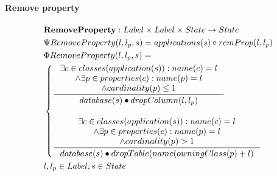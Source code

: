 \documentclass[11pt]{article}
\begin{document}
\paragraph{Remove property}
\begin{align*}
&	\mathbf{RemoveProperty} : Label \times Label \times State \rightarrow State \\
&	\Psi RemoveProperty(l, l_p, s) =  applications(s) \circ  remProp(l, l_p) \\
&	\Phi RemoveProperty(l, l_p, s) = \\
& \begin{cases}
		 \inference{\exists c \in classes(application(s)) : name(c) = l\\ 
		\wedge \exists p \in properties(c) : name(p) = l \\ \wedge cardinality(p) \leq 1}{database(s) \bullet dropColumn(l, l_p)}  \\\\
		 \inference{\exists c \in classes(application(s)) : name(c) = l\\ 
		\wedge \exists p \in properties(c)  : name(p) = l \\ \wedge cardinality(p)>1}{database(s) \bullet dropTable(name(owningClass(p)+l)}
 	\end{cases}\\
&	l, l_p \in Label, s \in State
\end{align*}
\end{document}
